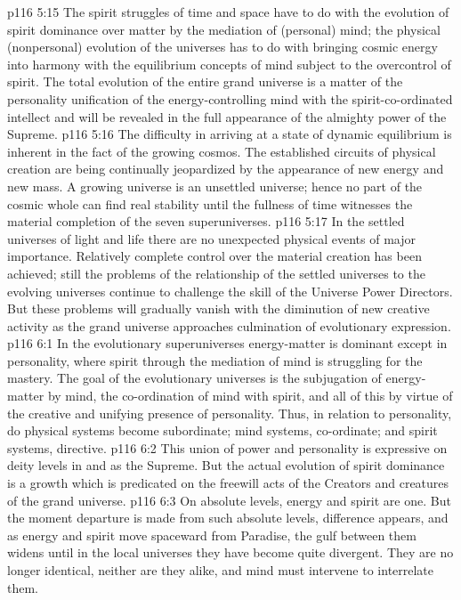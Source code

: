 \vs p116 5:15 The spirit struggles of time and space have to do with the evolution of spirit dominance over matter by the mediation of (personal) mind; the physical (nonpersonal) evolution of the universes has to do with bringing cosmic energy into harmony with the equilibrium concepts of mind subject to the overcontrol of spirit. The total evolution of the entire grand universe is a matter of the personality unification of the energy\hyp{}controlling mind with the spirit\hyp{}co\hyp{}ordinated intellect and will be revealed in the full appearance of the almighty power of the Supreme.
\vs p116 5:16 The difficulty in arriving at a state of dynamic equilibrium is inherent in the fact of the growing cosmos. The established circuits of physical creation are being continually jeopardized by the appearance of new energy and new mass. A growing universe is an unsettled universe; hence no part of the cosmic whole can find real stability until the fullness of time witnesses the material completion of the seven superuniverses.
\vs p116 5:17 In the settled universes of light and life there are no unexpected physical events of major importance. Relatively complete control over the material creation has been achieved; still the problems of the relationship of the settled universes to the evolving universes continue to challenge the skill of the Universe Power Directors. But these problems will gradually vanish with the diminution of new creative activity as the grand universe approaches culmination of evolutionary expression.
\vs p116 6:1 In the evolutionary superuniverses energy\hyp{}matter is dominant except in personality, where spirit through the mediation of mind is struggling for the mastery. The goal of the evolutionary universes is the subjugation of energy\hyp{}matter by mind, the co\hyp{}ordination of mind with spirit, and all of this by virtue of the creative and unifying presence of personality. Thus, in relation to personality, do physical systems become subordinate; mind systems, co\hyp{}ordinate; and spirit systems, directive.
\vs p116 6:2 This union of power and personality is expressive on deity levels in and as the Supreme. But the actual evolution of spirit dominance is a growth which is predicated on the freewill acts of the Creators and creatures of the grand universe.
\vs p116 6:3 \pc On absolute levels, energy and spirit are one. But the moment departure is made from such absolute levels, difference appears, and as energy and spirit move spaceward from Paradise, the gulf between them widens until in the local universes they have become quite divergent. They are no longer identical, neither are they alike, and mind must intervene to interrelate them.
